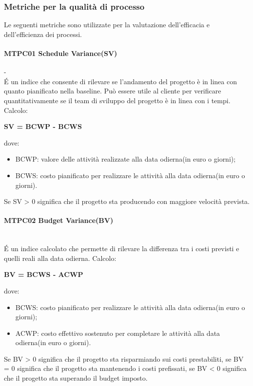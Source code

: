 \subsubsection{Metriche per la qualità di processo}
Le seguenti metriche sono utilizzate per la valutazione dell'efficacia e dell'efficienza dei processi.

\paragraph{MTPC01 Schedule Variance(SV)}\--\\
\'E un indice che consente di rilevare se l'andamento del progetto è in linea con quanto pianificato nella baseline\glossario. Può essere utile al cliente per verificare quantitativamente se il team di sviluppo del progetto è in linea con i tempi. \-\\
Calcolo:\-\\
\begin{center}
	\item \textbf{SV = BCWP - BCWS}
\end{center}
dove:
\begin{itemize}
	\item BCWP: valore delle attività realizzate alla data odierna(in euro o giorni);
	\item BCWS: costo pianificato per realizzare le attività alla data odierna(in euro o giorni).
\end{itemize}
Se SV > 0 significa che il progetto sta producendo con maggiore velocità prevista.

\paragraph{MTPC02 Budget Variance(BV)}\-\\
\'E un indice calcolato che permette di rilevare la differenza tra i costi previsti e quelli reali alla data odierna. 
Calcolo:
\begin{center}
	\item \textbf{BV = BCWS - ACWP}
\end{center} 
dove:
\begin{itemize}
	\item BCWS: costo pianificato per realizzare le attività alla data odierna(in euro o giorni);
	\item ACWP: costo effettivo sostenuto per completare le attività alla data odierna(in euro o giorni).
\end{itemize}
Se BV > 0 significa che il progetto sta risparmiando sui costi prestabiliti, se BV = 0 significa che il progetto sta mantenendo i costi prefissati, se BV < 0 significa che il progetto sta superando il budget imposto.

